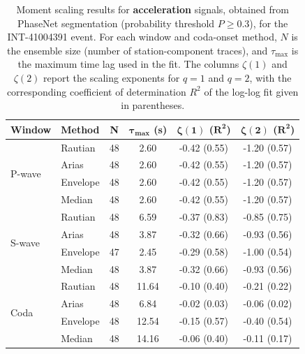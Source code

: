 \begin{table}[H]
\centering
\small
\begin{tabular}{llcccc}
\toprule
\textbf{Window} & \textbf{Method} & \textbf{N} & $\bm{\tau_{\max}}$ \textbf{(s)} & $\bm{\zeta(1)}$ \textbf{(}$\bm{R^2}$\textbf{)} & $\bm{\zeta(2)}$ \textbf{(}$\bm{R^2}$\textbf{)} \\
\midrule
\multirow{4}{*}{P-wave}
& Rautian & 48 & 2.60 & -0.42 (0.55) & -1.20 (0.57) \\
& Arias & 48 & 2.60 & -0.42 (0.55) & -1.20 (0.57) \\
& Envelope & 48 & 2.60 & -0.42 (0.55) & -1.20 (0.57) \\
& Median & 48 & 2.60 & -0.42 (0.55) & -1.20 (0.57) \\
\midrule
\multirow{4}{*}{S-wave}
& Rautian & 48 & 6.59 & -0.37 (0.83) & -0.85 (0.75) \\
& Arias & 48 & 3.87 & -0.32 (0.66) & -0.93 (0.56) \\
& Envelope & 47 & 2.45 & -0.29 (0.58) & -1.00 (0.54) \\
& Median & 48 & 3.87 & -0.32 (0.66) & -0.93 (0.56) \\
\midrule
\multirow{4}{*}{Coda}
& Rautian & 48 & 11.64 & -0.10 (0.40) & -0.21 (0.22) \\
& Arias & 48 & 6.84 & -0.02 (0.03) & -0.06 (0.02) \\
& Envelope & 48 & 12.54 & -0.15 (0.57) & -0.40 (0.54) \\
& Median & 48 & 14.16 & -0.06 (0.40) & -0.11 (0.17) \\
\bottomrule
\end{tabular}
\caption{Moment scaling results for \textbf{acceleration} signals, obtained from PhaseNet segmentation (probability threshold $P \geq 0.3$), for the INT-41004391 event. For each window and coda-onset method, $N$ is the ensemble size (number of station-component traces), and $\tau_{\max}$ is the maximum time lag used in the fit. The columns $\zeta(1)$ and $\zeta(2)$ report the scaling exponents for $q=1$ and $q=2$, with the corresponding coefficient of determination $R^2$ of the log-log fit given in parentheses.}
\label{tab:phasenet_scaling_acc_thresh30_queyras}
\end{table}